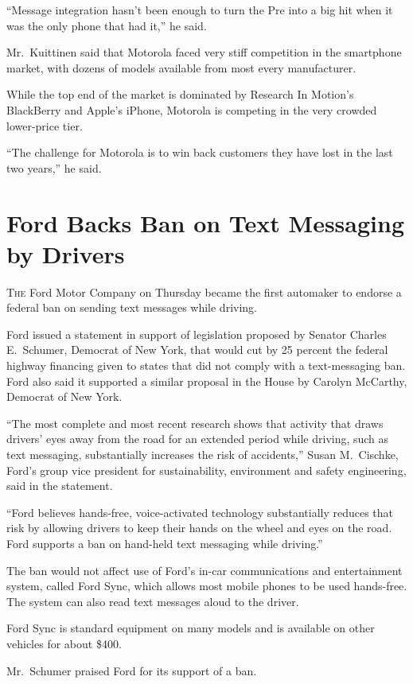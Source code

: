 ﻿\documentclass[12pt]{article}
\begin{document}
``Message integration hasn't been enough to turn the Pre into a big hit when it was the only phone
that had it,'' he said.

Mr.~Kuittinen said that Motorola faced very stiff competition in the smartphone market, with dozens
of models available from most every manufacturer.

While the top end of the market is dominated by Research In Motion's BlackBerry and Apple's iPhone,
Motorola is competing in the very crowded lower-price tier.

``The challenge for Motorola is to win back customers they have lost in the last two years,'' he
said.

\section{Ford Backs Ban on Text Messaging by Drivers}

\lettrine{T}{he} Ford Motor Company on Thursday became the first automaker to endorse a federal ban
on sending text messages while driving.

Ford issued a statement in support of legislation proposed by Senator Charles E.~Schumer, Democrat
of New York, that would cut by 25 percent the federal highway financing given to states that did not
comply with a text-messaging ban. Ford also said it supported a similar proposal in the House by
Carolyn McCarthy, Democrat of New York.

``The most complete and most recent research shows that activity that draws drivers' eyes away from
the road for an extended period while driving, such as text messaging, substantially increases the
risk of accidents,'' Susan M.~Cischke, Ford's group vice president for sustainability, environment
and safety engineering, said in the statement.

``Ford believes hands-free, voice-activated technology substantially reduces that risk by allowing
drivers to keep their hands on the wheel and eyes on the road. Ford supports a ban on hand-held text
messaging while driving.''

The ban would not affect use of Ford's in-car communications and entertainment system, called Ford
Sync, which allows most mobile phones to be used hands-free. The system can also read text messages
aloud to the driver.

Ford Sync is standard equipment on many models and is available on other vehicles for about \$400.

Mr.~Schumer praised Ford for its support of a ban.
\end{document}
